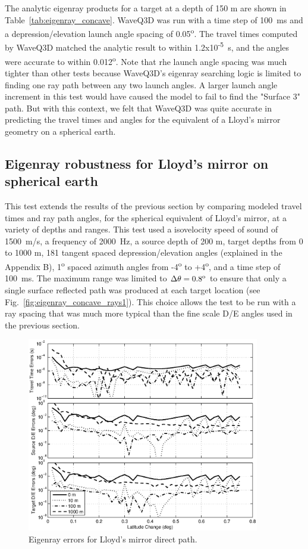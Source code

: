 \documentclass{ws-jca}
\begin{document}
The analytic eigenray products for a target at a depth of 150 m are shown
in Table~\ref{tab:eigenray_concave}. WaveQ3D was run with a time step of
100~ms and a depression/elevation launch angle spacing of
0.05\textsuperscript{o}. The travel times computed by WaveQ3D matched the
analytic result to within 1.2x10\textsuperscript{-5}~s, and the angles were
accurate to within 0.012\textsuperscript{o}. Note that rhe launch angle
spacing was much tighter than other tests because WaveQ3D's eigenray
searching logic is limited to finding one ray path between any two launch
angles. A larger launch angle increment in this test would have caused the
model to fail to find the "Surface 3" path. But with this context, we felt
that WaveQ3D was quite accurate in predicting the travel times and angles
for the equivalent of a Lloyd's mirror geometry on a spherical earth.

\subsection{Eigenray robustness for Lloyd's mirror on spherical earth}

This test extends the results of the previous section by comparing modeled
travel times and ray path angles, for the spherical equivalent of Lloyd's
mirror, at a variety of depths and ranges.
This test used a isovelocity speed of sound of 1500~m/s, a frequency of
2000~Hz, a source depth of 200 m, target depths from 0 to 1000 m, 181
tangent spaced depression/elevation angles (explained in the Appendix B),
1\textsuperscript{o} spaced azimuth angles from -4\textsuperscript{o} to
+4\textsuperscript{o}, and a time step of 100~ms. The maximum range was
limited to \(\Delta \theta = 0.8\textsuperscript{o}\) to ensure that only a
single surface reflected path was produced at each target location (see
Fig.~\ref{fig:eigenray_concave_rays1}). This choice allows the test to be
run with a ray spacing that was much more typical than the fine scale D/E
angles used in the previous section.
\begin{figure}[th]
	\centerline{\includegraphics[width=4in]{eigenray_lloyds_0.eps}} 
	\vspace*{8pt}
	\caption{Eigenray errors for Lloyd's mirror direct path.
	\label{fig:eigenray_lloyds_0}}
\end{figure}
\end{document}
